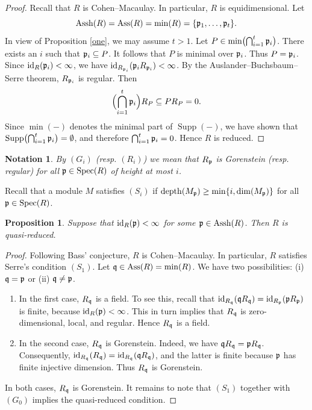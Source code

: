 \documentclass[10. pt,a4paper]{amsart}
\newtheorem{proposition}[theorem]{Proposition}
\newtheorem{notation}[theorem]{Notation}
\theoremstyle{definition}
\theoremstyle{remark}
\newcommand{\Ass}{\operatorname{Ass}}
\newcommand{\Assh}{\operatorname{Assh}}
\newcommand{\Spec}{\operatorname{Spec}}
\newcommand{\id}{\operatorname{id}}
\newcommand{\Supp}{\operatorname{Supp}}
\newcommand{\depth}{\operatorname{depth}}
\newcommand{\fp}{\frak{p}}
\newcommand{\fq}{\frak{q}}
\begin{document}
\begin{proof}
	Recall that $R$ is Cohen--Macaulay. In particular, $R$ is equidimensional. Let
	\[
	\Assh(R)=\Ass(R)=\min(R)=\{\fp_1,\ldots,\fp_t\}.
	\]
	In view of Proposition \ref{one}, we may assume $t>1$. Let $P\in\min\bigl(\bigcap_{i=1}^t \fp_i\bigr)$. There exists an $i$ such that $\fp_i\subseteq P$. It follows that $P$ is minimal over $\fp_i$. Thus $P=\fp_i$. Since $\id_R(\fp_i)<\infty$, we have $\id_{R_{\fp_i}}(\fp_i R_{\fp_i})<\infty$. By the Auslander--Buchsbaum--Serre theorem, $R_{\fp_i}$ is regular. Then
	\[
	\Bigl(\bigcap_{i=1}^t \fp_i\Bigr)R_P \subseteq P R_P = 0.
	\]
	Since $\min(-)$ denotes the minimal part of $\Supp(-)$, we have shown that $\Supp\bigl(\bigcap_{i=1}^t \fp_i\bigr)=\emptyset$, and therefore $\bigcap_{i=1}^t \fp_i = 0$. Hence $R$ is reduced.
\end{proof}

\begin{notation}
	By $(G_i)$ (resp. $(R_i)$) we mean that $R_\fp$ is Gorenstein (resp. regular) for all $\fp\in\Spec(R)$ of height at most $i$.
\end{notation}
Recall that a module $M$ satisfies $(S_i)$ if $\depth(M_{\fp})\geq \min\{i,\dim(M_\fp)\}$ for all $\fp\in\Spec(R)$.

\begin{proposition}\label{qr}
	Suppose that $\id_R(\fp)<\infty$ for some $\fp\in\Assh(R)$. Then $R$ is quasi-reduced.
\end{proposition}

\begin{proof}
	Following Bass'  conjecture, $R$ is Cohen--Macaulay. In particular, $R$ satisfies Serre's condition $(S_1)$.
	Let $\fq\in\Ass(R)=\min(R)$. We have two possibilities: (i) $\fq=\fp$ or (ii) $\fq\neq\fp$.
	
	\begin{enumerate}
		\item[(i)] In the first case, $R_{\fq}$ is a field. To see this, recall that $\id_{R_{\fq}}(\fq R_{\fq})=\id_{R_{\fp}}(\fp R_{\fp})$ is finite, because $\id_R(\fp)<\infty$. This in turn implies that $R_{\fq}$ is zero-dimensional, local, and regular. Hence $R_{\fq}$ is a field.
		
		\item[(ii)] In the second case, $R_{\fq}$ is Gorenstein. Indeed, we have $\fq R_{\fq} = \fp R_{\fq}$. Consequently, $\id_{R_{\fq}}(R_{\fq}) = \id_{R_{\fq}}(\fq R_{\fq})$, and the latter is finite because $\fp$ has finite injective dimension. Thus $R_{\fq}$ is Gorenstein.
	\end{enumerate}
	
	In both cases, $R_{\fq}$ is Gorenstein. It remains to note that $(S_1)$ together with $(G_0)$ implies the quasi-reduced condition.
\end{proof}
\end{document}
